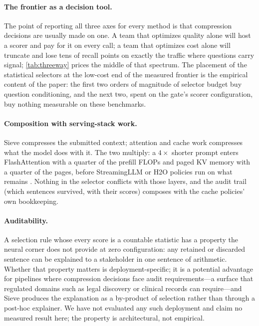 \documentclass[preprint,12pt]{elsarticle}
\theoremstyle{remark}
\newcommand{\method}{Sieve}
\begin{document}
\paragraph{The frontier as a decision tool.}
The point of reporting all three axes for every method is that
compression decisions are usually made on one. A team that optimizes
quality alone will host a scorer and pay for it on every call; a team
that optimizes cost alone will truncate and lose tens of recall
points on exactly the traffic where questions carry signal;
\autoref{tab:threeway} prices the middle of that spectrum. The
placement of the statistical selectors at the low-cost end of the
measured frontier is the empirical content of the paper: the first
two orders of magnitude of selector budget buy question conditioning,
and the next two, spent on the gate's scorer configuration, buy
nothing measurable on these benchmarks.

\paragraph{Composition with serving-stack work.}
\method{} compresses the submitted context; attention and cache work
compresses what the model does with it. The two multiply: a
$4\times$ shorter prompt enters FlashAttention
\citep{dao2022flashattention} with a quarter of the prefill FLOPs and
paged KV memory \citep{kwon2023vllm} with a quarter of the pages,
before StreamingLLM or H2O policies run on what remains
\citep{xiao2023streaming,zhang2023h2o}. Nothing in the selector
conflicts with those layers, and the audit trail (which sentences
survived, with their scores) composes with the cache policies' own
bookkeeping.

\paragraph{Auditability.}
A selection rule whose every score is a countable statistic has a
property the neural corner does not provide at zero configuration: any retained
or discarded sentence can be explained to a stakeholder in one
sentence of arithmetic. Whether that property matters is
deployment-specific; it is a potential advantage for pipelines where
compression decisions face audit requirements---a surface that
regulated domains such as legal discovery or clinical records can
require---and \method{} produces the explanation as a by-product of
selection rather than through a post-hoc explainer. We have not
evaluated any such deployment and claim no measured result here; the
property is architectural, not empirical.
\end{document}
